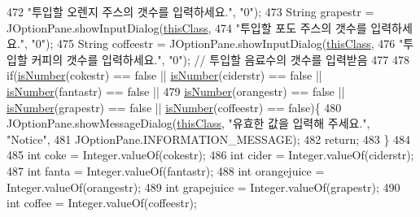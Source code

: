 \begin{DoxyCode}
{{{{{{{{{{{{{{{{{{{{{{{{{{{{{{{{{{{{{{{{{{{{{{{{{{{{{{{{{{{472                         \textcolor{stringliteral}{"투입할 오렌지 주스의 갯수를 입력하세요."}, \textcolor{stringliteral}{"0"});
473                 String grapestr = JOptionPane.showInputDialog(\hyperlink{class_vending_machine_1_1_machine_u_i_a0d705e137d12427a9af68595eb2be582}{thisClass},
474                         \textcolor{stringliteral}{"투입할 포도 주스의 갯수를 입력하세요."}, \textcolor{stringliteral}{"0"});
475                 String coffeestr = JOptionPane.showInputDialog(\hyperlink{class_vending_machine_1_1_machine_u_i_a0d705e137d12427a9af68595eb2be582}{thisClass},
476                         \textcolor{stringliteral}{"투입할 커피의 갯수를 입력하세요."}, \textcolor{stringliteral}{"0"});  \textcolor{comment}{// 투입할 음료수의 갯수를 입력받음}
477                 
478                 \textcolor{keywordflow}{if}(\hyperlink{class_vending_machine_1_1_machine_u_i_a7f5aa2e1b49c150c3b479b7e5123cf25}{isNumber}(cokestr) == \textcolor{keyword}{false} || \hyperlink{class_vending_machine_1_1_machine_u_i_a7f5aa2e1b49c150c3b479b7e5123cf25}{isNumber}(ciderstr) == \textcolor{keyword}{false} || 
      \hyperlink{class_vending_machine_1_1_machine_u_i_a7f5aa2e1b49c150c3b479b7e5123cf25}{isNumber}(fantastr) == \textcolor{keyword}{false} || 
479                         \hyperlink{class_vending_machine_1_1_machine_u_i_a7f5aa2e1b49c150c3b479b7e5123cf25}{isNumber}(orangestr) == \textcolor{keyword}{false} || \hyperlink{class_vending_machine_1_1_machine_u_i_a7f5aa2e1b49c150c3b479b7e5123cf25}{isNumber}(grapestr) == \textcolor{keyword}{false} || 
      \hyperlink{class_vending_machine_1_1_machine_u_i_a7f5aa2e1b49c150c3b479b7e5123cf25}{isNumber}(coffeestr) == \textcolor{keyword}{false})\{
480                     JOptionPane.showMessageDialog(\hyperlink{class_vending_machine_1_1_machine_u_i_a0d705e137d12427a9af68595eb2be582}{thisClass}, \textcolor{stringliteral}{"유효한 값을 입력해 주세요."}, \textcolor{stringliteral}{"Notice"}, 
481                             JOptionPane.INFORMATION\_MESSAGE);
482                     \textcolor{keywordflow}{return};
483                 \}
484                 
485                 \textcolor{keywordtype}{int} coke = Integer.valueOf(cokestr);
486                 \textcolor{keywordtype}{int} cider = Integer.valueOf(ciderstr);
487                 \textcolor{keywordtype}{int} fanta = Integer.valueOf(fantastr);
488                 \textcolor{keywordtype}{int} orangejuice = Integer.valueOf(orangestr);
489                 \textcolor{keywordtype}{int} grapejuice = Integer.valueOf(grapestr);
490                 \textcolor{keywordtype}{int} coffee = Integer.valueOf(coffeestr);
}}}}}}}}}}}}}}}}}}}}}}}}}}}}}}}}}}}}}}}}}}}}}}}}}}}}}}}}}}}
\end{DoxyCode}
